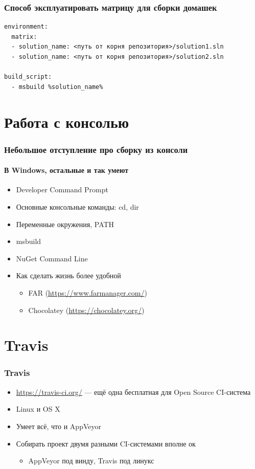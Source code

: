 \documentclass[xetex,mathserif,serif]{beamer}
\begin{document}
	\begin{frame}[fragile]
		\frametitle{Способ эксплуатировать матрицу для сборки домашек}
		\begin{verbatim}
environment:
  matrix:
  - solution_name: <путь от корня репозитория>/solution1.sln
  - solution_name: <путь от корня репозитория>/solution2.sln

build_script:
  - msbuild %solution_name%
		\end{verbatim}
	\end{frame}

	\section{Работа с консолью}

	\begin{frame}
		\frametitle{Небольшое отступление про сборку из консоли}
		\framesubtitle{В Windows, остальные и так умеют}
		\begin{itemize}
			\item Developer Command Prompt
			\item Основные консольные команды: cd, dir
			\item Переменные окружения, PATH
			\item msbuild
			\item NuGet Command Line
			\item Как сделать жизнь более удобной
			\begin{itemize}
				\item FAR (\url{https://www.farmanager.com/})
				\item Chocolatey (\url{https://chocolatey.org/})
			\end{itemize}
		\end{itemize}
	\end{frame}

	\section{Travis}

	\begin{frame}
		\frametitle{Travis}
		\begin{itemize}
			\item \url{https://travis-ci.org/} --- ещё одна бесплатная для Open Source CI-система
			\item Linux и OS X
			\item Умеет всё, что и AppVeyor
			\item Собирать проект двумя разными CI-системами вполне ок
			\begin{itemize}
				\item AppVeyor под винду, Travis под линукс
			\end{itemize}
		\end{itemize}
	\end{frame}
\end{document}
